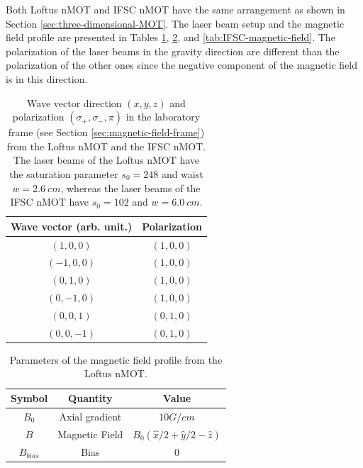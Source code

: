 Both Loftus nMOT and IFSC nMOT have the same arrangement as shown in Section \ref{sec:three-dimensional-MOT}. The laser beam setup and the magnetic field profile are presented in Tables \ref{tab:loftus-laser-beams}, \ref{tab:Loftus-magnetic-field}, and \ref{tab:IFSC-magnetic-field}. The polarization of the laser beams in the gravity direction are different than the polarization of the other ones since the negative component of the magnetic field is in this direction.

\begin{table}[ht!]
    \centering
    \caption{Wave vector direction $ (x, y, z) $ and polarization $ (\sigma_+, \sigma_-, \pi) $ in the laboratory frame (see Section \ref{sec:magnetic-field-frame}) from the Loftus nMOT and the IFSC nMOT. The laser beams of the Loftus nMOT have the saturation parameter $ s_0 = 248 $ and waist $ w = 2.6\ cm $, whereas the laser beams of the IFSC nMOT have $ s_0 = 102 $ and $ w = 6.0\ cm$.}
    \begin{tabular}{|c|c|}
        \hline
        \textbf{Wave vector (arb. unit.)} & \textbf{Polarization} \\ \hline
        $ (1, 0, 0) $ & $ (1, 0, 0) $ \\
        $ (-1, 0, 0) $ & $ (1, 0, 0) $ \\
        $ (0, 1, 0) $ & $ (1, 0, 0) $ \\
        $ (0, -1, 0) $ & $ (1, 0, 0) $ \\
        $ (0, 0, 1) $ & $ (0, 1, 0) $ \\
        $ (0, 0, -1) $ & $ (0, 1, 0) $ \\
        \hline
    \end{tabular}
    \vspace{10px}
    \label{tab:loftus-laser-beams}
\end{table}

\begin{table}[ht!]
    \centering
    \caption{Parameters of the magnetic field profile from the Loftus nMOT.}
    \begin{tabular}{|c|c|c|}
        \hline
        \textbf{Symbol} & \textbf{Quantity} & \textbf{Value} \\ \hline
        $ B_0 $ & Axial gradient & $ 10 G / cm $ \\
        $ B $ & Magnetic Field & $ B_0(\hat{x}/2 + \hat{y}/2 - \hat{z}) $ \\
        $ B_{bias} $ & Bias & $ 0 $ \\
        \hline
    \end{tabular}
    \vspace{10px}
    \label{tab:Loftus-magnetic-field}
\end{table}

